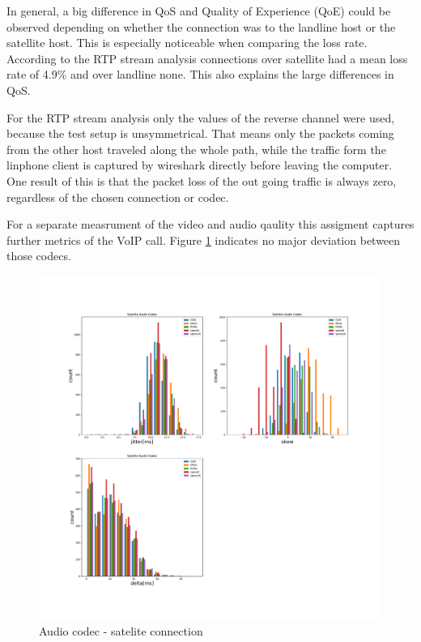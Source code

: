 \documentclass[parskip=full]{scrartcl}
\begin{document}
In general, a big difference in QoS and Quality of Experience (QoE) could be observed depending on whether the connection was to the landline host or the satellite host.
This is especially noticeable when comparing the loss rate.
According to the RTP stream analysis connections over satellite had a mean loss rate of 4.9\% and over landline none. 
This also explains the large differences in QoS.

For the RTP stream analysis only the values of the reverse channel were used, because the test setup is unsymmetrical.
That means only the packets coming from the other host traveled along the whole path, while the traffic form the linphone client is captured by wireshark directly before leaving the computer.
One result of this is that the packet loss of the out going traffic is always zero, regardless of the chosen connection or codec.

For a separate measrument of the video and audio qaulity this assigment captures further metrics of the VoIP call. Figure \ref{fig:Audio} indicates no major deviation between those codecs.

\begin{figure}[!ht]
	\centering %
	\includegraphics[width=\textwidth]{images/satelite-audio-histogram.pdf} %
	\caption{Audio codec - satelite connection} 
	\label{fig:Audio} %
\end{figure}
\end{document}
